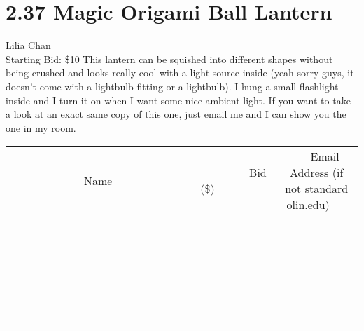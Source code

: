 \documentclass[11pt]{article}
\begin{document}
\section*{2.37 Magic Origami Ball Lantern}
Lilia Chan
\\
Starting Bid: \$10
\newline
This lantern can be squished into different shapes without being crushed and looks really cool with a light source inside (yeah sorry guys, it doesn't come with a lightbulb fitting or a lightbulb). I hung a small flashlight inside and I turn it on when I want some nice ambient light. If you want to take a look at an exact same copy of this one, just email me and I can show you the one in my room.
\\[6ex]
\begin{tabular}{c c c}
~~~~~~~~~~~~~Name~~~~~~~~~~~~~ & ~~~~~~~~~Bid (\$)~~~~~~~~~  & ~~~Email Address (if not standard olin.edu)~~~\\
 & & \\
\hline
 & & \\
\hline
 & & \\
\hline
 & & \\
\hline
 & & \\
\hline
 & & \\
\hline
 & & \\
\hline
 & & \\
\hline
 & & \\
\hline
 & & \\
\hline
 & & \\
\hline
 & & \\
\hline
 & & \\
\hline
 & & \\
\hline
 & & \\
\hline
 & & \\
\hline
 & & \\
\hline
 & & \\
\hline
 & & \\
\hline
 & & \\
\hline
 & & \\
\hline
 & & \\
\hline
 & & \\
\hline
 & & \\
\hline
 & & \\
\hline
 & & \\
\hline
\end{tabular}
\newpage
\end{document}
